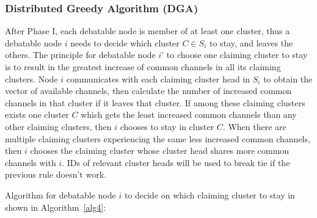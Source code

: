 %


\subsubsection{Distributed Greedy Algorithm (DGA)}
After Phase I, each debatable node is member of at least one cluster, thus a debatable node $i$ needs to decide which cluster $C\in S_i$ to stay, and leaves the others.
The principle for debatable node $i$' to choose one claiming cluster to stay is to result in the greatest increase of common channels in all its claiming clusters.
Node $i$ communicates with each claiming cluster head in $S_i$ to obtain the vector of available channels, then calculate the number of increased common channels in that cluster if it leaves that cluster.
If among these claiming clusters exists one cluster $C$ which gets the least increased common channels than any other claiming clusters, then $i$ chooses to stay in cluster $C$.
When there are multiple claiming clusters experiencing the same less increased common channels, then $i$ chooses the claiming cluster whose cluster head shares more common channels with $i$.
IDs of relevant cluster heads will be used to break tie if the previous rule doesn't work.

Algorithm for debatable node $i$ to decide on which claiming cluster to stay in shown in Algorithm~\ref{alg4}:


